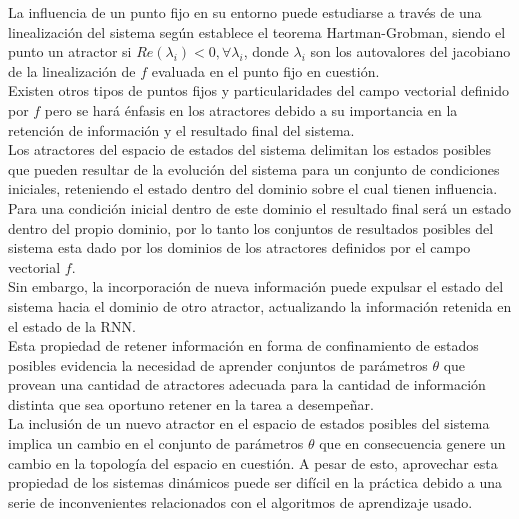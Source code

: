 \documentclass{article}
\begin{document}
	La influencia de un punto fijo en su entorno puede estudiarse a través de una linealización del sistema según establece el teorema Hartman-Grobman, siendo el punto un atractor si $Re(\lambda_i)<0, \forall \lambda_i$, donde $\lambda_i$ son los autovalores del jacobiano de la linealización de $f$ evaluada en el punto fijo en cuestión.\\
	
	Existen otros tipos de puntos fijos y particularidades del campo vectorial definido por $f$ pero se hará énfasis en los atractores debido a su importancia en la retención de información y el resultado final del sistema.\\
	
	Los atractores del espacio de estados del sistema delimitan los estados posibles que pueden resultar de la evolución del sistema para un conjunto de condiciones iniciales, reteniendo el estado dentro del dominio sobre el cual tienen influencia. \\
	Para una condición inicial dentro de este dominio el resultado final será un estado dentro del propio dominio, por lo tanto los conjuntos de resultados posibles del sistema esta dado por los dominios de los atractores definidos por el campo vectorial $f$. \\
	Sin embargo, la incorporación de nueva información puede expulsar el estado del sistema hacia el dominio de otro atractor, actualizando la información retenida en el estado de la RNN.\\
	
	Esta propiedad de retener información en forma de confinamiento de estados posibles evidencia la necesidad de aprender conjuntos de parámetros $\theta$ que provean una cantidad de atractores adecuada para la cantidad de información distinta que sea oportuno retener en la tarea a desempeñar. \\
	La inclusión de un nuevo atractor en el espacio de estados posibles del sistema implica un cambio en el conjunto de parámetros $\theta$ que en consecuencia genere un cambio en la topología del espacio en cuestión.
	A pesar de esto, aprovechar esta propiedad de los sistemas dinámicos puede ser difícil en la práctica debido a una serie de inconvenientes relacionados con el algoritmos de aprendizaje usado.\\
	
\end{document}
